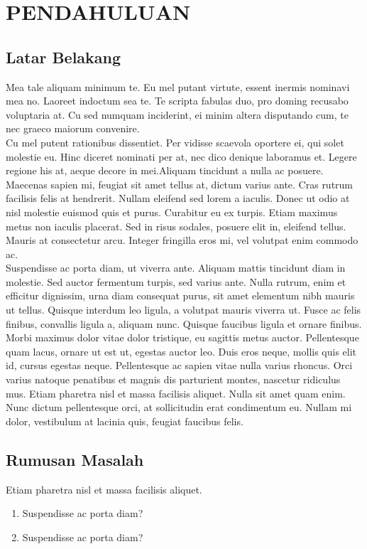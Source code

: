 \chapter{PENDAHULUAN}
\section{Latar Belakang}
Mea tale aliquam minimum te. Eu mel putant virtute, essent inermis nominavi mea no. Laoreet indoctum sea te. Te scripta fabulas duo, pro doming recusabo voluptaria at. Cu sed numquam inciderint, ei minim altera disputando cum, te nec graeco maiorum convenire.\\
Cu mel putent rationibus dissentiet. Per vidisse scaevola oportere ei, qui solet molestie eu. Hinc diceret nominati per at, nec dico denique laboramus et. Legere regione his at, aeque decore in mei.Aliquam tincidunt a nulla ac posuere. Maecenas sapien mi, feugiat sit amet tellus at, dictum varius ante. Cras rutrum facilisis felis at hendrerit. Nullam eleifend sed lorem a iaculis. Donec ut odio at nisl molestie euismod quis et purus. Curabitur eu ex turpis. Etiam maximus metus non iaculis placerat. Sed in risus sodales, posuere elit in, eleifend tellus. Mauris at consectetur arcu. Integer fringilla eros mi, vel volutpat enim commodo ac.\\

Suspendisse ac porta diam, ut viverra ante. Aliquam mattis tincidunt diam in molestie. Sed auctor fermentum turpis, sed varius ante. Nulla rutrum, enim et efficitur dignissim, urna diam consequat purus, sit amet elementum nibh mauris ut tellus. Quisque interdum leo ligula, a volutpat mauris viverra ut. Fusce ac felis finibus, convallis ligula a, aliquam nunc. Quisque faucibus ligula et ornare finibus. Morbi maximus dolor vitae dolor tristique, eu sagittis metus auctor. Pellentesque quam lacus, ornare ut est ut, egestas auctor leo. Duis eros neque, mollis quis elit id, cursus egestas neque. Pellentesque ac sapien vitae nulla varius rhoncus. Orci varius natoque penatibus et magnis dis parturient montes, nascetur ridiculus mus. Etiam pharetra nisl et massa facilisis aliquet. Nulla sit amet quam enim. Nunc dictum pellentesque orci, at sollicitudin erat condimentum eu. Nullam mi dolor, vestibulum at lacinia quis, feugiat faucibus felis.\\

\section{Rumusan Masalah}
Etiam pharetra nisl et massa facilisis aliquet.
\begin{enumerate}[nolistsep,leftmargin=0.5cm]
  \item Suspendisse ac porta diam?
  \item Suspendisse ac porta diam?\\
\end{enumerate}

